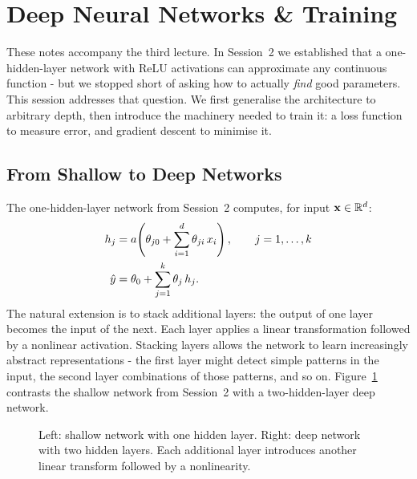 \section{Deep Neural Networks \& Training}

These notes accompany the third lecture. In Session~2 we established that a one-hidden-layer network with ReLU activations can approximate any continuous function - but we stopped short of asking how to actually \emph{find} good parameters. This session addresses that question. We first generalise the architecture to arbitrary depth, then introduce the machinery needed to train it: a loss function to measure error, and gradient descent to minimise it.

\subsection{From Shallow to Deep Networks}

The one-hidden-layer network from Session~2 computes, for input $\mathbf{x} \in \mathbb{R}^d$:
\begin{align}
h_j &= a\!\left(\theta_{j0} + \sum_{i=1}^{d} \theta_{ji}\, x_i\right), \qquad j = 1, \ldots, k \\
\hat{y} &= \theta_0 + \sum_{j=1}^{k} \theta_j\, h_j.
\end{align}
The natural extension is to stack additional layers: the output of one layer becomes the input of the next. Each layer applies a linear transformation followed by a nonlinear activation. Stacking layers allows the network to learn increasingly abstract representations - the first layer might detect simple patterns in the input, the second layer combinations of those patterns, and so on. Figure~\ref{fig:shallow_vs_deep} contrasts the shallow network from Session~2 with a two-hidden-layer deep network.

\begin{figure}[h]
    \centering
    \begin{minipage}{0.45\textwidth}
        \centering
        \resizebox{\textwidth}{!}{}
    \end{minipage}
    \hfill
    \begin{minipage}{0.50\textwidth}
        \centering
        \resizebox{\textwidth}{!}{}
    \end{minipage}
    \caption{Left: shallow network with one hidden layer. Right: deep network with two hidden layers. Each additional layer introduces another linear transform followed by a nonlinearity.}
    \label{fig:shallow_vs_deep}
\end{figure}

